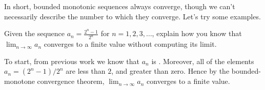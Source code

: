 \documentclass{ximera}
\begin{document}

In short, bounded monotonic sequences always converge, though we can't
necessarily describe the number to which they converge.  Let's try
some examples.

\begin{example}
  Given the sequence $a_n=\frac{2^n-1}{2^n}$ for $n=1,2,3,\dots$,
  explain how you know that $\lim_{n\to\infty} a_n$ converges to a
  finite value without computing its limit.
  \begin{explanation}
    To start, from previous work we know that $a_n$ is
    .
    Moreover, all of the elements $a_n = (2^n-1)/2^n$ are less than
    $2$, and greater than zero. Hence by the bounded-monotone
    convergence theorem, $\lim_{n\to\infty} a_n$ converges to a finite
    value.
  \end{explanation}
\end{example}
\end{document}
